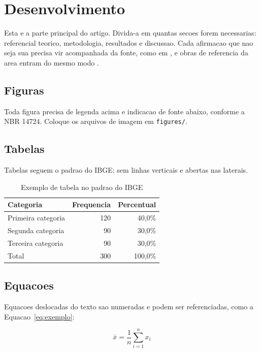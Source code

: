 \section{Desenvolvimento}
\label{sec:desenvolvimento}

Esta e a parte principal do artigo. Divida-a em quantas secoes forem
necessarias: referencial teorico, metodologia, resultados e discussao. Cada
afirmacao que nao seja sua precisa vir acompanhada da fonte, como em
\cite{exemplo2024}, e obras de referencia da area entram do mesmo modo
\cite{knuth1984}.

\subsection{Figuras}
\label{subsec:figuras}

Toda figura precisa de legenda acima e indicacao de fonte abaixo, conforme a
NBR 14724. Coloque os arquivos de imagem em \texttt{figures/}.

%

\subsection{Tabelas}
\label{subsec:tabelas}

Tabelas seguem o padrao do IBGE: sem linhas verticais e abertas nas laterais.

\begin{table}[htb]
  \centering
  \caption{Exemplo de tabela no padrao do IBGE}
  \label{tab:exemplo}
  \begin{tabular}{lrr}
    \toprule
    \textbf{Categoria} & \textbf{Frequencia} & \textbf{Percentual} \\
    \midrule
    Primeira categoria & 120 & 40,0\% \\
    Segunda categoria  &  90 & 30,0\% \\
    Terceira categoria &  90 & 30,0\% \\
    \midrule
    Total              & 300 & 100,0\% \\
    \bottomrule
  \end{tabular}
\end{table}

\subsection{Equacoes}
\label{subsec:equacoes}

Equacoes deslocadas do texto sao numeradas e podem ser referenciadas, como a
Equacao~\eqref{eq:exemplo}:

\begin{equation}
  \label{eq:exemplo}
  \bar{x} = \frac{1}{n} \sum_{i=1}^{n} x_i
\end{equation}
